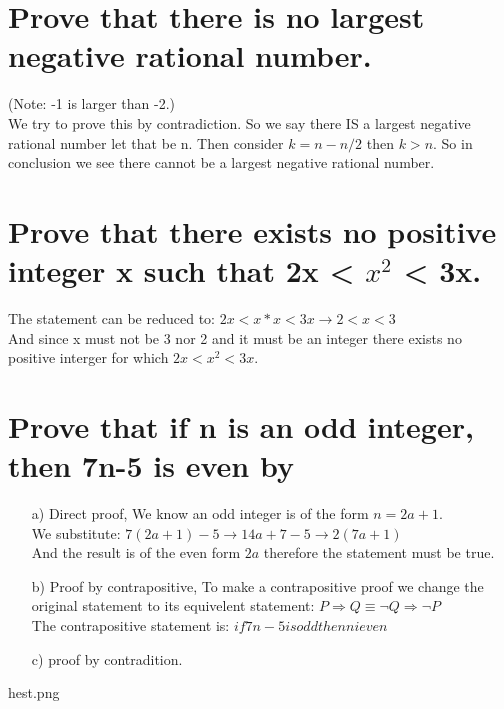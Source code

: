 \section{Prove that there is no largest negative rational number.}
(Note: -1 is larger than -2.)\\
We try to prove this by contradiction. So we say there IS a largest negative rational number let that be n.
Then consider $k=n-n/2$ then $k>n$. So in conclusion we see there cannot be a largest negative rational number.

\section{Prove that there exists no positive integer x such that 2x < $x^2$ < 3x.}
The statement can be reduced to: $2x<x*x<3x\rightarrow2<x<3$\\
And since x must not be 3 nor 2 and it must be an integer there exists no positive interger for which $2x<x^2<3x$.

\section{Prove that if n is an odd integer, then 7n-5 is even by}
\begin{itemize}
\item[a)] Direct proof,
We know an odd integer is of the form $n=2a+1$.\\
We substitute: $7(2a+1)-5\rightarrow14a+7-5\rightarrow2(7a+1)$\\
And the result is of the even form $2a$ therefore the statement must be true.
\item[b)] Proof by contrapositive,
To make a contrapositive proof we change the original statement to its equivelent statement: $P \Rightarrow Q \equiv \neg Q \Rightarrow \neg P$\\
The contrapositive statement is: $if 7n-5 is odd then n i even$\\

\item[c)] proof by contradition.
\end{itemize}
hest.png

